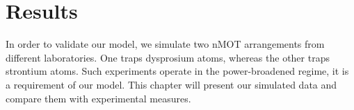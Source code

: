 %
\chapter{Results}
\label{ch:results}
% 

In order to validate our model, we simulate two nMOT arrangements from different laboratories. One traps dysprosium atoms, whereas the other traps strontium atoms. Such experiments operate in the power-broadened regime, it is a requirement of our model. This chapter will present our simulated data and compare them with experimental measures.

%


%

